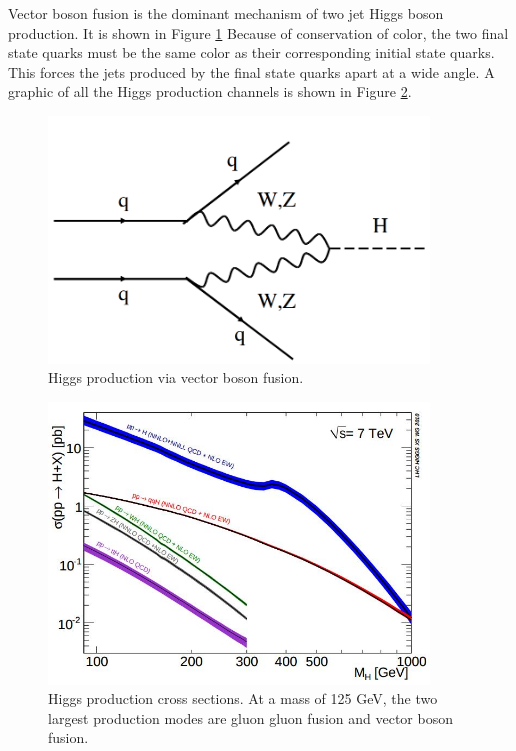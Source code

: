 \documentclass[oneside, letterpaper, oldfontcommands]{memoir}
\begin{document}
\qquad Vector boson fusion is the dominant mechanism of two jet Higgs boson production. It is shown in Figure \ref{fig:vbfHiggs} Because of conservation of color, the two final state quarks must be the same color as their corresponding initial state quarks. This forces the jets produced by the final state quarks apart at a wide angle. A graphic of all the Higgs production channels is shown in Figure \ref{fig:higgsproduction}\cite{Dittmaier:2011ti}.

\begin{figure}[here]
\includegraphics[width=0.9\textwidth]{vbfHiggs.png}
\caption{Higgs production via vector boson fusion.}
\label{fig:vbfHiggs}
\end{figure}

\begin{figure}[here]
\includegraphics[width=0.9\textwidth]{higgsproduction.jpg}
\caption{Higgs production cross sections\cite{Dittmaier:2011ti}. At a mass of 125 GeV, the two largest production modes are gluon gluon fusion and vector boson fusion.}
\label{fig:higgsproduction}
\end{figure}
\end{document}
